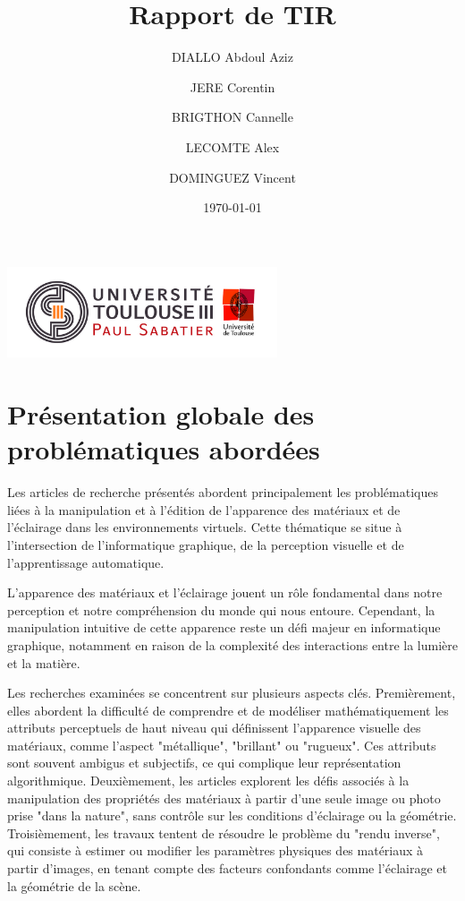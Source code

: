 \documentclass{article}
\title{
    Rapport de TIR
}
\author{DIALLO Abdoul Aziz \and JERE Corentin \and BRIGTHON Cannelle \and LECOMTE Alex \and DOMINGUEZ Vincent}
\date{\today}
\begin{document}
\maketitle

\begin{center}
    \vspace*{\fill} %
    \includegraphics[width=0.6\textwidth]{Logo_UT3.jpg}
    \vspace*{\fill} %
\end{center}

\newpage
\tableofcontents
\newpage

\section{Présentation globale des problématiques abordées}

Les articles de recherche présentés abordent principalement les problématiques liées à la manipulation et à l'édition de l'apparence des matériaux et de l'éclairage dans les environnements virtuels. Cette thématique se situe à l'intersection de l'informatique graphique, de la perception visuelle et de l'apprentissage automatique. 

L'apparence des matériaux et l'éclairage jouent un rôle fondamental dans notre perception et notre compréhension du monde qui nous entoure. Cependant, la manipulation intuitive de cette apparence reste un défi majeur en informatique graphique, notamment en raison de la complexité des interactions entre la lumière et la matière.

Les recherches examinées se concentrent sur plusieurs aspects clés. Premièrement, elles abordent la difficulté de comprendre et de modéliser mathématiquement les attributs perceptuels de haut niveau qui définissent l'apparence visuelle des matériaux, comme l'aspect "métallique", "brillant" ou "rugueux". Ces attributs sont souvent ambigus et subjectifs, ce qui complique leur représentation algorithmique. Deuxièmement, les articles explorent les défis associés à la manipulation des propriétés des matériaux à partir d'une seule image ou photo prise "dans la nature", sans contrôle sur les conditions d'éclairage ou la géométrie. Troisièmement, les travaux tentent de résoudre le problème du "rendu inverse", qui consiste à estimer ou modifier les paramètres physiques des matériaux à partir d'images, en tenant compte des facteurs confondants comme l'éclairage et la géométrie de la scène.
\end{document}
